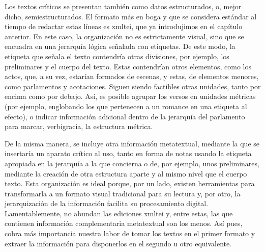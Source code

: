 Los textos críticos se presentan también como datos estructurados, o, mejor dicho, semiestructurados. El formato más en boga y que se considera estándar al tiempo de redactar estas líneas es \ac{xmltei}, que ya introdujimos en el capítulo anterior. En este caso, la organización no es estrictamente visual, sino que se encuadra en una jerarquía lógica señalada con etiquetas. De este modo, la etiqueta que señala el texto contendría otras divisiones, por ejemplo, los preliminares y el cuerpo del texto. Estas contendrían otros elementos, como los actos, que, a su vez, estarían formados de escenas, y estas, de elementos menores, como parlamentos y acotaciones. Siguen siendo factibles otras unidades, tanto por encima como por debajo. Así, es posible agrupar los versos en unidades métricas (por ejemplo, englobando los que pertenecen a un romance en una etiqueta al efecto), o indicar información adicional dentro de la jerarquía del parlamento para marcar, verbigracia, la estructura métrica.

De la misma manera, se incluye otra información metatextual, mediante la que se insertaría un aparato crítico al uso, tanto en forma de notas usando la etiqueta apropiada en la jerarquía a la que concierna o de, por ejemplo, unos preliminares, mediante la creación de otra estructura aparte y al mismo nivel que el cuerpo texto. Esta organización es ideal porque, por un lado, existen herramientas para transformarla a un formato visual tradicional para su lectura y, por otro, la jerarquización de la información facilita su procesamiento digital. Lamentablemente, no abundan las ediciones \ac{xmltei} y, entre estas, las que contienen información complementaria metatextual son los menos. Así pues, cobra más importancia nuestra labor de tomar los textos en el primer formato y extraer la información para disponerlos en el segundo u otro equivalente.

